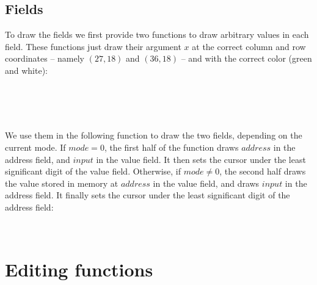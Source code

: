 \subsection{Fields}

To draw the fields we first provide two functions to draw arbitrary values in
each field. These functions just draw their argument $x$ at the correct column
and row coordinates -- namely $(27,18)$ and $(36,18)$ -- and with the correct
color (green and white):

\begin{TwoColumns}
\\
\\
\\
\end{TwoColumns}

We use them in the following function to draw the two fields, depending on the
current mode. If $mode=0$, the first half of the function draws $address$ in
the address field, and $input$ in the value field. It then sets the cursor
under the least significant digit of the value field. Otherwise, if $mode \ne
0$, the second half draws the value stored in memory at $address$ in the value
field, and draws $input$ in the address field. It finally sets the cursor under
the least significant digit of the address field:

\begin{TwoColumns}
\\
\end{TwoColumns}

\section{Editing functions}

